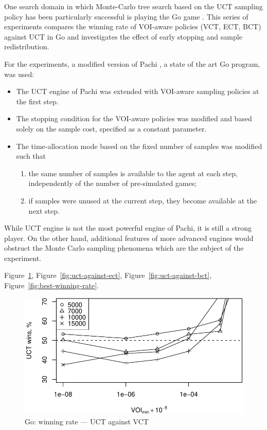 \documentclass{article}
\begin{document}
One search domain in which Monte-Carlo tree search based on the UCT
sampling policy has been particularly successful is playing the Go
game \cite{Gelly.mogo}. This series of experiments compares
the winning rate of VOI-aware policies (VCT, ECT, BCT) against UCT 
in Go and investigates the effect of early stopping and sample
redistribution. 

For the experiments, a modified version of Pachi \cite{Braudis.pachi},
a state of the art Go program, was used:
\begin{itemize}
\item The UCT engine of Pachi was extended with VOI-aware sampling
  policies at the first step. 
\item The stopping condition for the VOI-aware policies was
  modified and based solely on the sample cost, specified as
  a constant parameter. 
\item The time-allocation mode based on the fixed number of samples
  was modified such that 
  \begin{enumerate}
    \item the same number of samples is available to
      the agent at each step, independently of the number of pre-simulated
      games;  
    \item if samples were unused at the current step,
      they become available at the next step.
  \end{enumerate}
\end{itemize}
While UCT engine is not the most powerful engine of Pachi, it is still
a strong player. On the other hand, additional
features of more advanced engines would obstruct the Monte Carlo
sampling phenomena which are the subject of the experiment.


Figure~\ref{fig:uct-against-vct}, Figure~\ref{fig:uct-against-ect},
Figure~\ref{fig:uct-against-bct}, Figure~\ref{fig:best-winning-rate}.

\begin{figure}[h]
\centering
\includegraphics[scale=0.8]{vct-wins.pdf}
\caption{Go: winning rate --- UCT against VCT}
\label{fig:uct-against-vct}
\end{figure}
\end{document}
